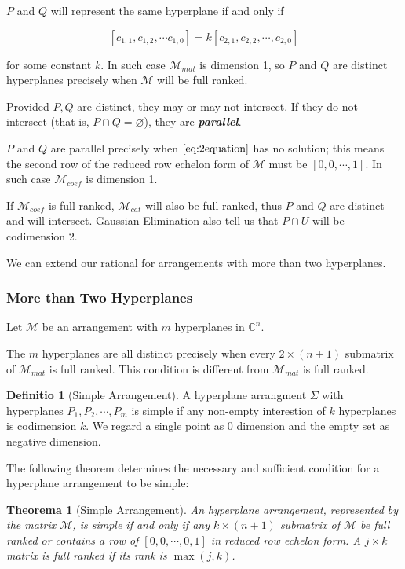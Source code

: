 \documentclass[12pt, a4paper]{article}
\newtheorem{theorem}{Theorema}[subsection]
\theoremstyle{definition}
\newtheorem{definition}{Definitio}[section]
\theoremstyle{remark}
\newcommand{\bb}[1]{\mathbb{#1}}
\renewcommand{\emph}[1]{\textit{\textbf{#1}}}
\begin{document}
$P$ and $Q$ will represent the same hyperplane if and only if 

$$
[c_{1,1}, c_{1,2}, \cdots c_{1,0}] = k [c_{2,1}, c_{2,2}, \cdots, c_{2, 0}]
$$

for some constant $k$. 
In such case $\mathcal{M}_{mat}$ is dimension 1, so $P$ and $Q$ are distinct hyperplanes precisely when $\mathcal{M}$ will be full ranked. 

Provided $P, Q$ are distinct, they may or may not intersect. 
If they do not intersect (that is, $P \cap Q = \varnothing$), they are \emph{parallel}.

$P$ and $Q$ are parallel precisely when $\ref{eq:2equation}$ has no solution; this means the second row of the reduced row echelon form of $\mathcal{M}$ must be $[0, 0, \cdots, 1]$. In such case $\mathcal{M}_{coef}$ is dimension 1.

If $\mathcal{M}_{coef}$ is full ranked, $\mathcal{M}_{cat}$ will also be full ranked, thus $P$ and $Q$ are distinct and will intersect. 
Gaussian Elimination also tell us that $P \cap U$ will be codimension 2.

We can extend our rational for arrangements with more than two hyperplanes.

\subsubsection{More than Two Hyperplanes}

Let $\mathcal{M}$ be an arrangement with $m$ hyperplanes in $\bb{C}^n$. 

The $m$ hyperplanes are all distinct precisely when every $2\times (n+1)$ submatrix of $\mathcal{M}_{mat}$ is full ranked. 
This condition is different from $\mathcal{M}_{mat}$ is full ranked.

\begin{definition}[Simple Arrangement]
A hyperplane arrangment $\Sigma$ with hyperplanes $P_1, P_2, \cdots, P_m$ is simple if any non-empty interestion of $k$ hyperplanes is codimension $k$.
We regard a single point as 0 dimension and the empty set as negative dimension.
\end{definition}

The following theorem determines the necessary and sufficient condition for a hyperplane arrangement to be simple:

\begin{theorem}[Simple Arrangement]
	An hyperplane arrangement, represented by the matrix $\mathcal{M}$, is simple if and only if any $k \times (n+1) $ submatrix of $\mathcal{M}$ be full ranked or contains a row of $[0, 0, \cdots, 0, 1]$ in reduced row echelon form. 
	A $j \times  k$ matrix is full ranked if its rank is $\max(j,k)$.
\end{theorem}
\end{document}
